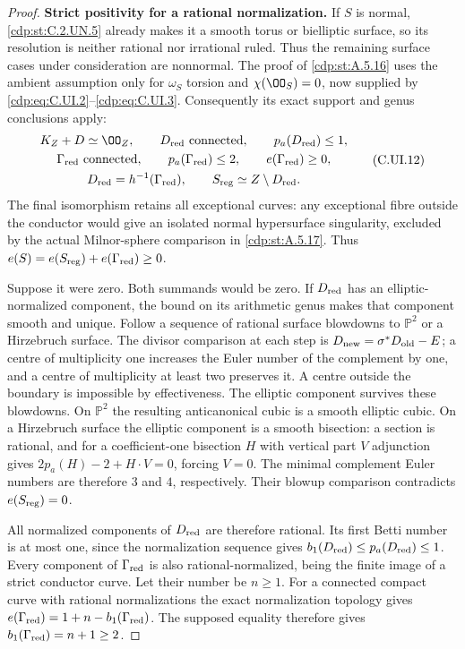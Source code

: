 \begin{proof}
\par\medskip\noindent\textbf{Strict positivity for a rational normalization.}\quad
If $S$ is normal, \ref{cdp:st:C.2.UN.5} already makes it a
smooth torus or bielliptic surface, so its
resolution is neither rational nor irrational
ruled. Thus the remaining surface cases under
consideration are nonnormal.
The proof of \ref{cdp:st:A.5.16} uses the ambient assumption
only for $\omega_S$ torsion and $\chi(\OO_S)=0$,
now supplied by \eqref{cdp:eq:C.UI.2}--\eqref{cdp:eq:C.UI.3}. Consequently
its exact support and genus conclusions apply:
\[
 \begin{gathered}
 K_Z+D\simeq\OO_Z,\qquad D_{\rm red}\text{ connected},
 \qquad p_a(D_{\rm red})\le1,\\
 \Gamma_{\rm red}\text{ connected},\qquad
 p_a(\Gamma_{\rm red})\le2,\qquad
 e(\Gamma_{\rm red})\ge0,\\
 D_{\rm red}=h^{-1}(\Gamma_{\rm red}),\qquad
 S_{\rm reg}\simeq Z\setminus D_{\rm red}.
 \end{gathered}
 \tag{C.UI.12}\label{cdp:eq:C.UI.12}
\]
The final isomorphism retains all exceptional curves:
any exceptional fibre outside the conductor would
give an isolated normal hypersurface singularity,
excluded by the actual Milnor-sphere comparison
in \ref{cdp:st:A.5.17}. Thus
$e(S)=e(S_{\rm reg})+e(\Gamma_{\rm red})\ge0$.

Suppose it were zero. Both summands would be zero.
If $D_{\rm red}$ has an elliptic-normalized component,
the bound on its arithmetic genus makes that component
smooth and unique. Follow a sequence of rational
surface blowdowns to $\mathbb P^2$ or a Hirzebruch
surface. The divisor comparison at each step is
$D_{\rm new}=\sigma^*D_{\rm old}-E$; a centre of
multiplicity one increases the Euler number of the
complement by one, and a centre of multiplicity at
least two preserves it. A centre outside the
boundary is impossible by effectiveness. The
elliptic component survives these blowdowns.
On $\mathbb P^2$ the resulting anticanonical cubic
is a smooth elliptic cubic. On a Hirzebruch
surface the elliptic component is a smooth
bisection: a section is rational, and for a
coefficient-one bisection $H$ with vertical part
$V$ adjunction gives
$2p_a(H)-2+H\cdot V=0$, forcing $V=0$.
The minimal complement Euler numbers are therefore
$3$ and $4$, respectively. Their blowup comparison
contradicts $e(S_{\rm reg})=0$.

All normalized components of $D_{\rm red}$ are
therefore rational. Its first Betti number is at
most one, since the normalization sequence gives
$b_1(D_{\rm red})\le p_a(D_{\rm red})\le1$.
Every component of $\Gamma_{\rm red}$ is also
rational-normalized, being the finite image of a
strict conductor curve. Let their number be
$n\ge1$. For a connected compact curve with
rational normalizations the exact normalization
topology gives
$e(\Gamma_{\rm red})=1+n-b_1(\Gamma_{\rm red})$.
The supposed equality therefore gives
$b_1(\Gamma_{\rm red})=n+1\ge2$.


\end{proof}
